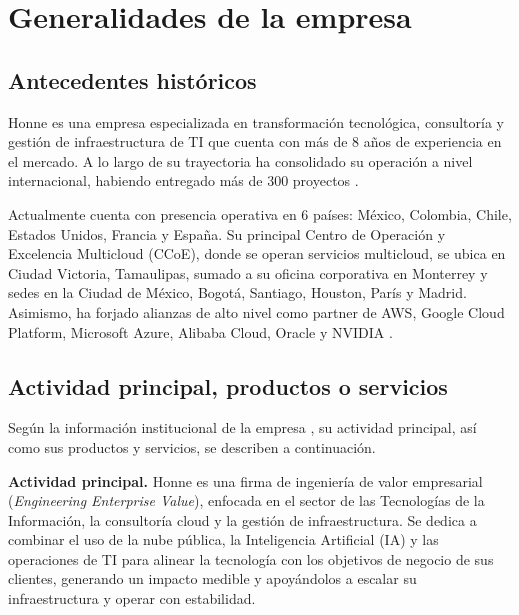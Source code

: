 \section{Generalidades de la empresa}
\label{ch:generalidades}

\subsection{Antecedentes históricos}
\label{sec:antecedentes_historicos}

Honne es una empresa especializada en transformación tecnológica, consultoría y gestión de infraestructura de TI que cuenta con más de 8 años de experiencia en el mercado. A lo largo de su trayectoria ha consolidado su operación a nivel internacional, habiendo entregado más de 300 proyectos \cite{honne_oficial_2026}.

Actualmente cuenta con presencia operativa en 6 países: México, Colombia, Chile, Estados Unidos, Francia y España. Su principal Centro de Operación y Excelencia Multicloud (CCoE), donde se operan servicios multicloud, se ubica en Ciudad Victoria, Tamaulipas, sumado a su oficina corporativa en Monterrey y sedes en la Ciudad de México, Bogotá, Santiago, Houston, París y Madrid. Asimismo, ha forjado alianzas de alto nivel como partner de AWS, Google Cloud Platform, Microsoft Azure, Alibaba Cloud, Oracle y NVIDIA \cite{honne_oficial_2026}.

\subsection{Actividad principal, productos o servicios}
\label{sec:giro_actividad}

Según la información institucional de la empresa \cite{honne_oficial_2026}, su actividad principal, así como sus productos y servicios, se describen a continuación.

\textbf{Actividad principal.} Honne es una firma de ingeniería de valor empresarial (\textit{Engineering Enterprise Value}), enfocada en el sector de las Tecnologías de la Información, la consultoría cloud y la gestión de infraestructura. Se dedica a combinar el uso de la nube pública, la Inteligencia Artificial (IA) y las operaciones de TI para alinear la tecnología con los objetivos de negocio de sus clientes, generando un impacto medible y apoyándolos a escalar su infraestructura y operar con estabilidad.

